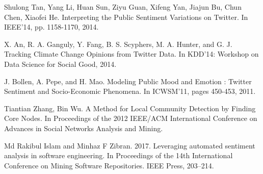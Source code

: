 \documentclass[runningheads]{llncs}
\begin{document}
\begin{thebibliography}{8}
Shulong Tan, Yang Li, Huan Sun, Ziyu Guan, Xifeng Yan, Jiajun Bu, Chun Chen, Xiaofei He.
\newblock Interpreting the Public Sentiment Variations on Twitter. 
\newblock In IEEE’14, pp. 1158-1170, 2014.

X. An, R. A. Ganguly, Y. Fang, B. S. Scyphers, M. A. Hunter, and G. J.
\newblock Tracking Climate Change Opinions from Twitter Data. 
\newblock In KDD’14: Workshop on Data Science for Social Good, 2014.

J. Bollen, A. Pepe, and H. Mao.
\newblock Modeling Public Mood and Emotion : Twitter Sentiment and Socio-Economic Phenomena. 
\newblock In ICWSM’11, pages 450-453, 2011.

Tiantian Zhang, Bin Wu.
\newblock A Method for Local Community Detection by Finding Core Nodes. 
\newblock In Proceedings of the 2012 IEEE/ACM International Conference on Advances in Social Networks Analysis and Mining.

Md Rakibul Islam and Minhaz F Zibran. 2017.
\newblock Leveraging automated sentiment analysis in software engineering. 
\newblock In Proceedings of the 14th International Conference on Mining Software Repositories. IEEE Press, 203–214.

\end{thebibliography}
\end{document}
